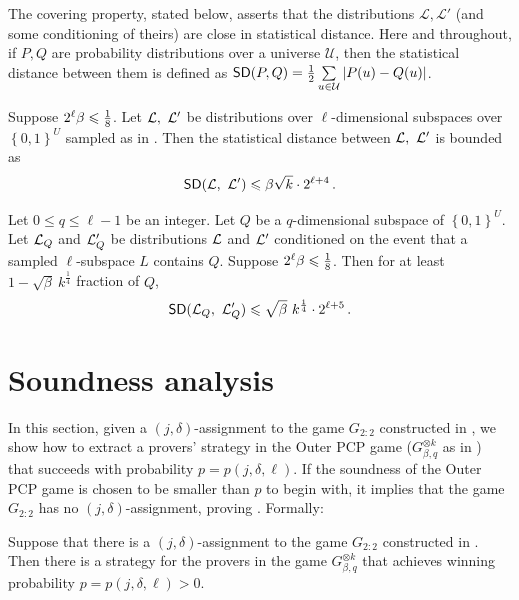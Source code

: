 \documentclass{toc}
\newcommand\card[1]{\left| {#1} \right|}
\newcommand\set[1]{{\left\{ #1 \right\}}}
\newcommand\power[1]{\set{0,1}^{#1}}
\newcommand\eigth{{1\over8}}
\renewcommand\leq{\leqslant}
\begin{document}
The covering property, stated below, asserts that the distributions $\mathcal{L},\mathcal{L}'$ (and some conditioning of theirs)
are close in statistical distance. Here and throughout, if $P, Q$ are probability distributions over a universe $\mathcal{U}$, then
the statistical distance between them is defined as ${\sf SD}(P,Q) = \frac{1}{2}\sum\limits_{u\in\mathcal{U}}\card{P(u) - Q(u)}$.
\begin{lemma}\label{lemma:covering_normal}
Suppose $2^{\ell}\beta \leqslant \eigth$. Let ${\cal L}, ~{\cal L}'$ be distributions over $\ell$-dimensional subspaces over $\power{U}$
 sampled as in . Then the statistical
distance between ${\cal L}, ~{\cal L}'$ is bounded as
$$
{\sf SD}({\cal L}, ~{\cal L}')\leqslant  \beta \sqrt{k}\cdot 2^{\ell+4}\,.$$%
\end{lemma}


\begin{lemma}\label{lemma:covering_cond_markov} Let $0 \leq q \leq \ell-1$ be an integer. Let $Q$ be
a $q$-dimensional subspace of $\power{U}$. Let ${\cal L}_Q$ and ${\cal L}'_Q$ be
distributions ${\cal L}$ and ${\cal L}'$ conditioned on the event that a sampled $\ell$-subspace $L$ contains $Q$.
Suppose $2^{\ell}\beta \leqslant \eigth$. Then for at least $1 - \sqrt{\beta}~k^{\frac{1}{4}} $
fraction of $Q$,
\begin{equation}\label{eq:SD_cond_Q}
{\sf SD}  ({\cal L}_Q, ~{\cal L}'_Q ) \leqslant \sqrt{\beta} ~k^{\frac{1}{4}} \cdot 2^{\ell+5}\,.%
\end{equation}
\end{lemma}


\section{Soundness analysis}\label{section:soundness}

In this section, given a $(j,\delta)$-assignment to the game $G_{2:2}$ constructed in ,
we show how to extract a
provers' strategy in the Outer PCP game ($G_{\beta, q}^{\otimes k}$ as in )
that succeeds with probability
$p = p(j, \delta,\ell)$. If the soundness of the Outer PCP
game is chosen to be smaller than $p$ to begin with, it implies that the game $G_{2:2}$ has no $(j,\delta)$-assignment,
proving . Formally:
\begin{lemma}\label{lem:main_soundness}
  Suppose that there is a $(j,\delta)$-assignment to the game $G_{2:2}$ constructed in .
  Then there is a strategy for the provers in the game $G_{\beta, q}^{\otimes k}$ that achieves winning probability
  $p = p(j,\delta,\ell) > 0$.
\end{lemma}
\end{document}

